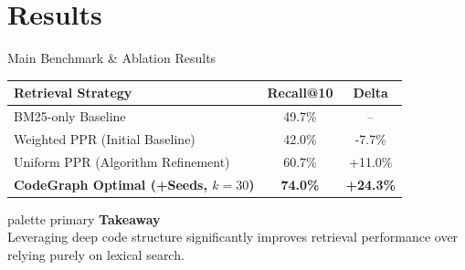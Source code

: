 \documentclass[aspectratio=169]{beamer}
\begin{document}
\section{Results}
\begin{frame}{Main Benchmark \& Ablation Results}
  \vspace{0.5cm}
  \centering
  \renewcommand{\arraystretch}{1.5}
  \begin{tabular}{@{}l c c@{}}
    \toprule
    \textbf{Retrieval Strategy} & \textbf{Recall@10} & \textbf{Delta} \\
    \midrule
    BM25-only Baseline & 49.7\% & -- \\
    Weighted PPR (Initial Baseline) & 42.0\% & -7.7\% \\
    Uniform PPR (Algorithm Refinement) & 60.7\% & +11.0\% \\
    \rowcolor{PrimaryTeal!15}
    \textbf{CodeGraph Optimal (+Seeds, $k=30$)} & \textbf{74.0\%} & \textbf{+24.3\%} \\
    \bottomrule
  \end{tabular}
  
  \vspace{0.4cm}
  \begin{beamercolorbox}[rounded=true, shadow=true, sep=8pt, center, wd=0.95\textwidth]{palette primary}
    \textbf{Takeaway}\\
    Leveraging deep code structure significantly improves retrieval performance over relying purely on lexical search.
  \end{beamercolorbox}
\end{frame}
\end{document}
